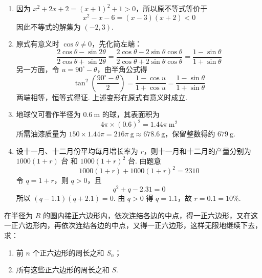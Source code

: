 \begin{solution}
\begin{enumerate}
    \item 因为 \(x^2+2x+2=(x+1)^2+1>0\)，所以原不等式等价于
    \[
    x^2-x-6=(x-3)(x+2)<0
    \]
    因此不等式的解集为 \(\left(-2,3\right)\).

    \item 原式有意义时 \(\cos\theta\ne0\)，先化简左端：
    \[
    \frac{2\cos\theta-\sin2\theta}{2\cos\theta+\sin2\theta}=\frac{2\cos\theta-2\sin\theta\cos\theta}{2\cos\theta+2\sin\theta\cos\theta}=\frac{1-\sin\theta}{1+\sin\theta}
    \]
    另一方面，令 \(u=90^\circ-\theta\)，由半角公式得
    \[
    \tan^2\left(\frac{90^\circ-\theta}{2}\right)=\frac{1-\cos u}{1+\cos u}=\frac{1-\sin\theta}{1+\sin\theta}
    \]
    两端相等，恒等式得证. 上述变形在原式有意义时成立.

    \item 地球仪可看作半径为 \(0.6\mathrm{~m}\) 的球，其表面积为
    \[
    4\pi\times\left(0.6\right)^2=1.44\pi\mathrm{~m}^2
    \]
    所需油漆质量为 \(150\times1.44\pi=216\pi\mathrm{~g}\approx678.6\mathrm{~g}\)，保留整数得约 \(679\mathrm{~g}\).

    \item 设十一月、十二月份平均每月增长率为 \(r\)，则十一月和十二月的产量分别为 \(1000(1+r)\text{ 台}\) 和 \(1000(1+r)^2\text{ 台}\). 由题意
    \[
    1000(1+r)+1000(1+r)^2=2310
    \]
    令 \(q=1+r\)，则 \(q>0\)，且
    \[
    q^2+q-2.31=0
    \]
    所以 \((q-1.1)(q+2.1)=0\). 由 \(q>0\) 得 \(q=1.1\)，故 \(r=0.1=10\%\).
\end{enumerate}
\end{solution}

\begin{problem}
在半径为 \(R\) 的圆内接正六边形内，依次连结各边的中点，得一正六边形，又在这一正六边形内，再依次连结各边的中点，又得一正六边形，这样无限地继续下去，求：

\begin{enumerate}
    \item 前 \(n\) 个正六边形的周长之和 \(S_n\)；
    \item 所有这些正六边形的周长之和 \(S\).
\end{enumerate}
\end{problem}

